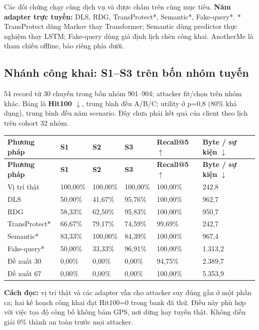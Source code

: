 \documentclass[10pt,a4paper]{article}
\begin{document}
Các đối chứng chạy cùng dịch vụ và được chấm trên cùng mục tiêu. \textbf{Năm adapter trực tuyến:} DLS, RDG, TransProtect*, Semantic*, Fake-query*. * TransProtect dùng Markov thay Transformer; Semantic dùng predictor thực nghiệm thay LSTM; Fake-query dùng giả định lịch chèn công khai. AnotherMe là tham chiếu offline, báo riêng phía dưới.

\subsection{Nhánh công khai: S1–S3 trên bốn nhóm tuyến}\label{sub:3.1}
54 record từ 30 chuyến trong bốn nhóm 901–904; attacker fit/chọn trên nhóm khác. Bảng là \textbf{Hit100 $\downarrow$}, trung bình đều A/B/C; utility ở p=0,8 (80\% khả dụng), trung bình đều năm scenario. Đây chưa phải kết quả của client theo lịch trên cohort 32 nhóm.

\begingroup\small
\begin{longtable}{@{}P{3.425cm}P{1.998cm}P{1.998cm}P{1.998cm}P{2.854cm}P{3.520cm}@{}}
\toprule
\textbf{Phương pháp} & \textbf{S1} & \textbf{S2} & \textbf{S3} & \textbf{Recall@5 $\uparrow$} & \textbf{Byte / sự kiện $\downarrow$}\\\midrule
\endfirsthead
\toprule
\textbf{Phương pháp} & \textbf{S1} & \textbf{S2} & \textbf{S3} & \textbf{Recall@5 $\uparrow$} & \textbf{Byte / sự kiện $\downarrow$}\\\midrule
\endhead
\bottomrule\endfoot
Vị trí thật & 100,00\% & 100,00\% & 100,00\% & 100,00\% & 242,8\\
\addlinespace[3pt]
DLS & 50,00\% & 41,67\% & 95,76\% & 100,00\% & 962,7\\
\addlinespace[3pt]
RDG & 58,33\% & 62,50\% & 95,83\% & 100,00\% & 950,7\\
\addlinespace[3pt]
TransProtect* & 66,67\% & 79,17\% & 74,59\% & 99,69\% & 242,7\\
\addlinespace[3pt]
Semantic* & 83,33\% & 100,00\% & 84,39\% & 100,00\% & 967,4\\
\addlinespace[3pt]
Fake-query* & 50,00\% & 33,33\% & 96,91\% & 100,00\% & 1.313,2\\
\addlinespace[3pt]
Đề xuất 30 & 0,00\% & 0,00\% & 0,00\% & 94,75\% & 2.389,7\\
\addlinespace[3pt]
Đề xuất 67 & 0,00\% & 0,00\% & 0,00\% & 100,00\% & 5.353,9\\
\end{longtable}
\endgroup
\textbf{Cách đọc:} vị trí thật và các adapter vẫn cho attacker suy đúng gần ở một phần ca; hai kế hoạch công khai đạt Hit100=0 trong bank đã thử. Điều này phù hợp với việc tọa độ công bố không bám GPS, nơi dừng hay tuyến thật. Không diễn giải 0\% thành an toàn trước mọi attacker.
\end{document}
